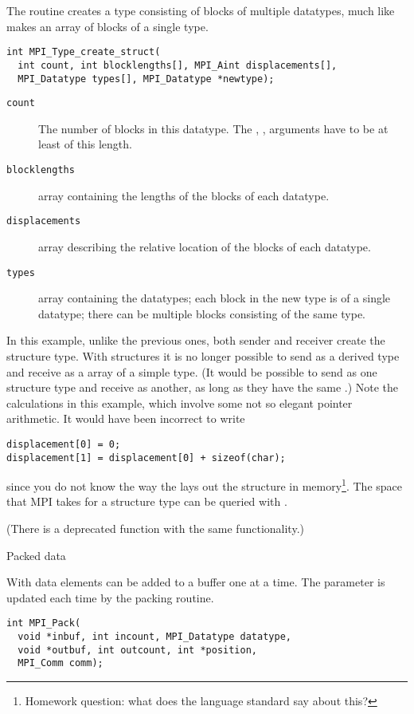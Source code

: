The  routine creates
a type consisting of blocks of multiple datatypes,
much like  makes
an array of blocks of a single type.
\begin{verbatim}
int MPI_Type_create_struct(
  int count, int blocklengths[], MPI_Aint displacements[],
  MPI_Datatype types[], MPI_Datatype *newtype);
\end{verbatim}
\begin{description}
\item[\texttt{count}] The number of blocks in this
  datatype. The , , 
  arguments have to be at least of this length.
\item[\texttt{blocklengths}] array containing the lengths of the blocks of each datatype.
\item[\texttt{displacements}] array describing the relative location
  of the blocks of each datatype.
\item[\texttt{types}] array containing the datatypes; each block in
  the new type is of a single datatype; there can be multiple
  blocks consisting of the same type.
\end{description}
In this example, unlike the previous ones, both sender and receiver
create the structure type. With structures it is no longer possible to
send as a derived type and receive as a array of a simple type.
(It would be possible to send as one structure type and receive as another, 
as long as they have the same .)
Note the  calculations in this example,
which involve some not so elegant pointer arithmetic.
It would have been incorrect to write
\begin{verbatim}
displacement[0] = 0;
displacement[1] = displacement[0] + sizeof(char);
\end{verbatim}
since you do not know the way the  lays out the
structure in memory\footnote{Homework question: what does the language
  standard say about this?}.
The space that MPI takes for a structure type can be queried 
with .

(There is a deprecated function  with the same
functionality.)


 {Packed data}

With  data elements can be added 
to a buffer one at a time. The  parameter is updated
each time by the packing routine.
\begin{verbatim}
int MPI_Pack(
  void *inbuf, int incount, MPI_Datatype datatype,
  void *outbuf, int outcount, int *position,
  MPI_Comm comm);
\end{verbatim}

